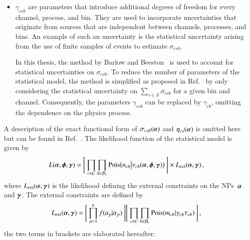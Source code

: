 \begin{itemize}
\item $\gamma_{csb}$ are parameters that introduce additional degrees of freedom
  for every channel, process, and bin. They are used to incorporate
  uncertainties that originate from sources that are independent between
  channels, processes, and bins. An example of such an uncertainty is the
  statistical uncertainty arising from the use of finite samples of events to
  estimate $\sigma_{csb}$.

  In this thesis, the method by Barlow and Beeston~\cite{barlow1993} is used to
  account for statistical uncertainties on $\sigma_{csb}$. To reduce the number
  of parameters of the statistical model, the method is simplified as proposed
  in Ref.~\cite{conway2011} by only considering the statistical uncertainty on
  $\sum_{s \in \mathcal{S}} \sigma_{csb}$ for a given bin and
  channel. Consequently, the parameters $\gamma_{csb}$ can be replaced by
  $\gamma_{cb}$, omitting the dependence on the physics process.

\end{itemize}
A description of the exact functional form of $\sigma_{csb}(\myvec{\alpha})$ and
$\eta_{cs}(\myvec{\alpha})$ is omitted here but can be found in
Ref.~\cite{cranmer2012}. The likelihood function of the statistical model is
given by
\begin{align}
  L(\myvec{\alpha}, \myvec{\phi}, \myvec{\gamma}) = \Biggl[\,
  \prod_{c \in \mathcal{C}}
  \prod_{b \in \mathcal{B}_{c}}
  \pois\bigl( n_{cb} \big| \nu_{cb}(\myvec{\alpha}, \myvec{\phi}, \myvec{\gamma}) \bigr)
  \,\Biggr]
  \times L_{\text{ext}}(\myvec{\alpha}, \myvec{\gamma}) \,\text{,}
  \label{eq:likelihood_histfactory}
\end{align}
where $L_{\text{ext}}(\myvec{\alpha}, \myvec{\gamma})$ is the likelihood
defining the external constraints on the NPs~$\myvec{\alpha}$ and
$\myvec{\gamma}$. The external constraints are defined by
\begin{align*}
  L_{\text{ext}}(\myvec{\alpha}, \myvec{\gamma}) =
  \Biggl[\, \prod_{p=1}^{n} f(a_p \vert \alpha_p)     \,\Biggr]
  \Biggl[\, \prod_{c \in \mathcal{C}} \prod_{b \in \mathcal{B}_{c}} \pois(m_{cb} \vert \gamma_{cb} \tau_{cb}) \,\Biggr] \,\text{,}
\end{align*}
the two terms in brackets are elaborated hereafter:
